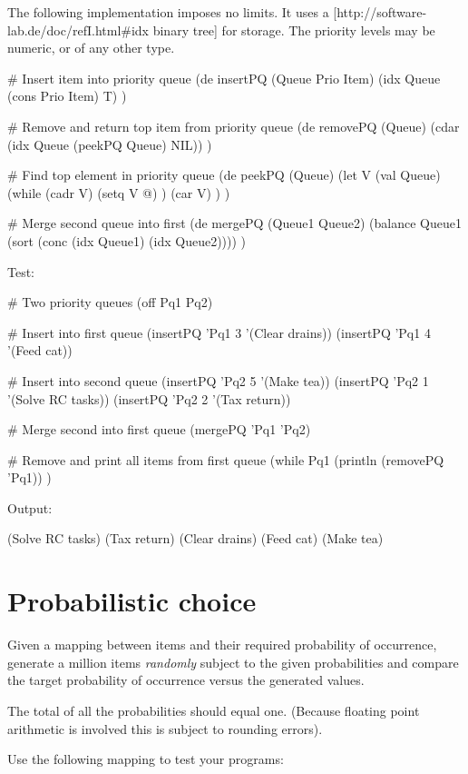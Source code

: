 \begin{wideverbatim}

The following implementation imposes no limits. It uses a
[http://software-lab.de/doc/refI.html#idx binary tree] for storage. The priority
levels may be numeric, or of any other type.

# Insert item into priority queue
(de insertPQ (Queue Prio Item)
   (idx Queue (cons Prio Item) T) )

# Remove and return top item from priority queue
(de removePQ (Queue)
   (cdar (idx Queue (peekPQ Queue) NIL)) )

# Find top element in priority queue
(de peekPQ (Queue)
   (let V (val Queue)
      (while (cadr V)
         (setq V @) )
      (car V) ) )

# Merge second queue into first
(de mergePQ (Queue1 Queue2)
   (balance Queue1 (sort (conc (idx Queue1) (idx Queue2)))) )

Test:

# Two priority queues
(off Pq1 Pq2)

# Insert into first queue
(insertPQ 'Pq1 3 '(Clear drains))
(insertPQ 'Pq1 4 '(Feed cat))

# Insert into second queue
(insertPQ 'Pq2 5 '(Make tea))
(insertPQ 'Pq2 1 '(Solve RC tasks))
(insertPQ 'Pq2 2 '(Tax return))

# Merge second into first queue
(mergePQ 'Pq1 'Pq2)

# Remove and print all items from first queue
(while Pq1
   (println (removePQ 'Pq1)) )

Output:

(Solve RC tasks)
(Tax return)
(Clear drains)
(Feed cat)
(Make tea)

\end{wideverbatim}

\pagebreak{}
\section*{Probabilistic choice}

Given a mapping between items and their required probability of
occurrence, generate a million items \emph{randomly} subject to the
given probabilities and compare the target probability of occurrence
versus the generated values.

The total of all the probabilities should equal one. (Because floating
point arithmetic is involved this is subject to rounding errors).

Use the following mapping to test your programs:


